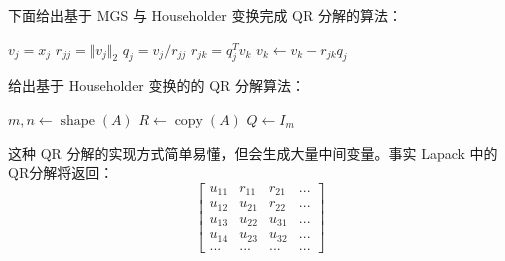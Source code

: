 下面给出基于 MGS 与 Householder 变换完成 QR 分解的算法：
\begin{center}
    \begin{minipage}{.7\linewidth}
        \begin{algorithm}[H]
            \caption{}
            {
            $v_j=x_j$\;
            {
            $r_{jj}=\Vert v_j\Vert_2$\;
            $q_j=v_j/r_{jj}$\;
            {
                $r_{jk}=q_j^T v_k$\;
                $v_k\leftarrow v_k - r_{jk}q_j$\;
            }
            }
            }
        \end{algorithm}
    \end{minipage}
\end{center}
给出基于 Householder 变换的的 QR 分解算法：
\begin{center}
    \begin{minipage}{.7\linewidth}
        \begin{algorithm}[H]
            \caption{}
            $m, n \leftarrow \operatorname{shape}(A)$\;
            $R \leftarrow \operatorname{copy}(A)$\;
            $Q \leftarrow I_{m}$\;
        \end{algorithm}
    \end{minipage}
\end{center}
这种 QR 分解的实现方式简单易懂，但会生成大量中间变量。事实 Lapack 中的QR分解将返回：
\begin{equation*}
    \left[\begin{array}{lllll} u_{11} & r_{11} & r_{21} & ... \\
             u_{12}         & u_{21} & r_{22} & ... \\
             u_{13}         & u_{22} & u_{31} & ... \\
             u_{14}         & u_{23} & u_{32} & ... \\
             ...            & ...    & ...    & ...\end{array}\right]
\end{equation*}
